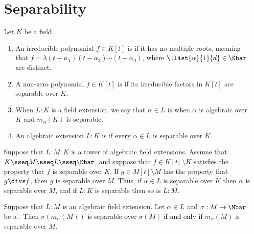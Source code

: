 \documentclass{article}
\begin{document}
\section{Separability} %
\setcounter{definition}{24}
  \begin{definition}[Separable]
    Let $ K $ be a field. \begin{enumerate}[label=(\roman*)]
      \item An irreducible polynomial $ f\in K[t] $ is  if it has no multiple roots, meaning that $ f=\lambda(t-\alpha_1)(t-\alpha_2)\cdots(t-\alpha_d) $, where $ \llist{\alpha}{1}{d}\in \Kbar $ are distinct.
      \item A non-zero polynomial $ f\in K[t] $ is  if its irreducible factors in $ K[t] $ are separable over $ K $.
      \item When $ L:K $ is a field extension, we say that $ \alpha \in L $ is  when $ \alpha $ is algebraic over $ K $ and $ m_\alpha(K) $ is separable.
      \item An algebraic extension $ L:K $ is  if every $ \alpha\in L $ is separable over $ K $.
    \end{enumerate}
  \end{definition}

  \begin{proposition}
    Suppose that $ L:M:K $ is a tower of algebraic field extensions.
    Assume that $ K\sseq M\sseq L\sseq \Kbar $, and suppose that $ f\in K[t]\setminus K $ satisfies the property that $ f $ is separable over $ K $.
    If $ g\in M[t]\setminus M $ has the property that $ g\divs f $, then $ g $ is separable over $ M $.
    Thus, if $ \alpha\in L $ is separable over $ K $ then $ \alpha $ is separable over $ M $, and if $ L:K $ is separable then so is $ L:M $.
  \end{proposition}

  \begin{proposition}
    Suppose that $ L:M $ is an algebraic field extension.
    Let $ \alpha\in L $ and $ \sigma:M\to\Mbar $ be a \homo.
    Then $ \sigma(m_\alpha(M)) $ is separable over $ \sigma(M) $ if and only if $ m_\alpha(M) $ is separable over $ M $.
  \end{proposition}
\end{document}
